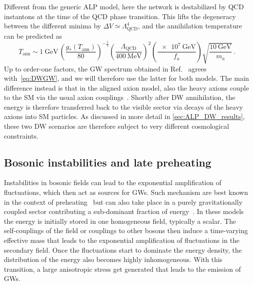 \documentclass{article}
\newcommand*{\geff}{\ensuremath{g_{*}}\xspace}
\begin{document}
Different from the generic ALP model, here the network is destabilized by QCD instantons at the time of the QCD phase transition. This lifts the degeneracy between the different minima by $\Delta V \simeq \Lambda_\mathrm{QCD}^{4}$, and the annihilation temperature can be predicted as~\cite{Higaki:2016jjh}
\begin{equation}
    T_\mathrm{ann} \sim \SI{1}{\GeV}\, \left(\frac{\geff(T_\mathrm{ann})}{80}\right)^{-\frac{1}{4}}\left(\frac{\Lambda_\mathrm{QCD}}{\SI{400}{\MeV}}\right)^{2}\left(\frac{\SI{e7}{\GeV}}{f_a}\right) \sqrt{\frac{\SI{10}{\GeV}}{m_a}}\,.
\end{equation}
%
Up to order-one factors, the GW spectrum obtained in Ref.~\cite{Higaki:2016jjh} agrees with~\cref{eq:DWGW}, and we will therefore use the latter for both models. The main difference instead is that in the aligned axion model, also the heavy axions couple to the SM via the usual axion couplings~\cite{Higaki:2015jag}. Shortly after DW annihilation, the energy is therefore transferred back to the visible sector via decays of the heavy axions into SM particles. As discussed in more detail in \cref{sec:ALP_DW_results}, these two DW scenarios are therefore subject to very different cosmological constraints. 

\subsection{Bosonic instabilities and late preheating}
\label{sec:audible_axion}

Instabilities in bosonic fields can lead to the exponential amplification of fluctuations, which then act as sources for GWs. Such mechanism are best known in the context of preheating~\cite{Greene:1997fu,Kofman:1994rk,Shtanov:1994ce,Kofman:1997yn,Dufaux:2007pt,Figueroa:2016wxr} but can also take place in a purely gravitationally coupled sector contributing a sub-dominant fraction of energy~\cite{Chatrchyan:2020pzh,Eroncel:2022vjg,Machado:2018nqk,Kitajima:2020rpm}. In these models the energy is initially stored in one homogeneous field, typically a scalar. The self-couplings of the field or couplings to other bosons then induce a time-varying effective mass that leads to the exponential amplification of fluctuations in the secondary field. Once the fluctuations start to dominate the energy density, the distribution of the energy also becomes highly inhomogeneous. With this transition, a large anisotropic stress get generated that leads to the emission of GWs.
\end{document}
